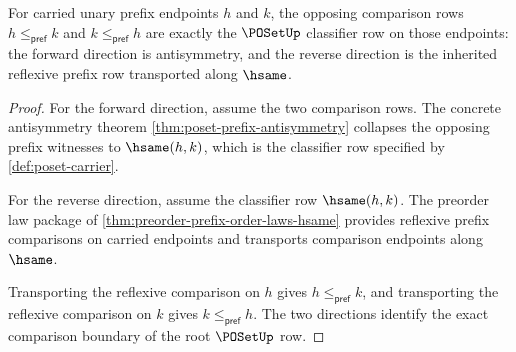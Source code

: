 \begin{theorem}
\label{thm:poset-root-exactness-obligation}
For carried unary prefix endpoints $h$ and $k$, the opposing comparison rows
$h\le_{\mathsf{pref}}k$ and $k\le_{\mathsf{pref}}h$ are exactly the
$\POSetUp$ classifier row on those endpoints: the forward direction is
antisymmetry, and the reverse direction is the inherited reflexive prefix row
transported along $\hsame$.
\end{theorem}
\begin{proof}
For the forward direction, assume the two comparison rows. The concrete
antisymmetry theorem \autoref{thm:poset-prefix-antisymmetry} collapses the
opposing prefix witnesses to $\hsame(h,k)$, which is the classifier row
specified by \autoref{def:poset-carrier}.

For the reverse direction, assume the classifier row $\hsame(h,k)$. The
preorder law package of \autoref{thm:preorder-prefix-order-laws-hsame}
provides reflexive prefix comparisons on carried endpoints and transports
comparison endpoints along $\hsame$.

Transporting the reflexive comparison on $h$ gives $h\le_{\mathsf{pref}}k$,
and transporting the reflexive comparison on $k$ gives
$k\le_{\mathsf{pref}}h$. The two directions identify the exact comparison
boundary of the root $\POSetUp$ row.
\end{proof}

